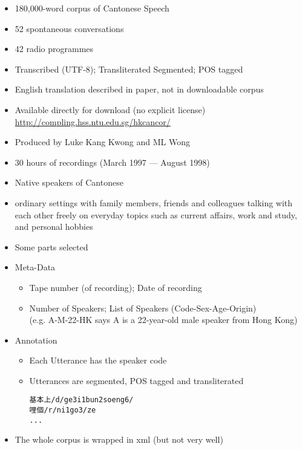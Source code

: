 \documentclass[a4paper,landscape,headrule,footrule,dvips]{foils}
\begin{document}
\begin{CJK}{UTF8}{min}


\begin{itemize}
\item 180,000-word corpus of Cantonese Speech
\item 52 spontaneous conversations
\item 42 radio programmes
\item Transcribed (UTF-8); Transliterated Segmented; POS tagged
\item English translation described in paper, not in downloadable corpus
\item Available directly for download (no explicit license)
\\ \url{http://compling.hss.ntu.edu.sg/hkcancor/}
\item Produced by Luke Kang Kwong and ML Wong
\end{itemize}
\begin{itemize}
\item 30 hours of recordings (March 1997 --- August 1998)
\item Native speakers of Cantonese
\item ordinary settings with family members, friends and colleagues talking with each other freely on everyday topics such as current affairs, work and study, and personal hobbies
\item Some parts selected
\end{itemize}

\begin{itemize}
\item Meta-Data
  \begin{itemize}
  \item Tape number (of recording);  Date of recording
  \item Number of Speakers; List of Speakers (Code-Sex-Age-Origin) \\
(e.g. A-M-22-HK says A is a 22-year-old male speaker from Hong Kong)
  \end{itemize}
\item Annotation
  \begin{itemize}
  \item Each Utterance has the speaker code
  \item Utterances are segmented, POS tagged and transliterated
    \begin{verbatim}
基本上/d/ge3i1bun2soeng6/
哩個/r/ni1go3/ze
...
\end{verbatim}
  \end{itemize}
\item The whole corpus is wrapped in xml (but not very well)
\end{itemize}



\end{CJK}
\end{document}

